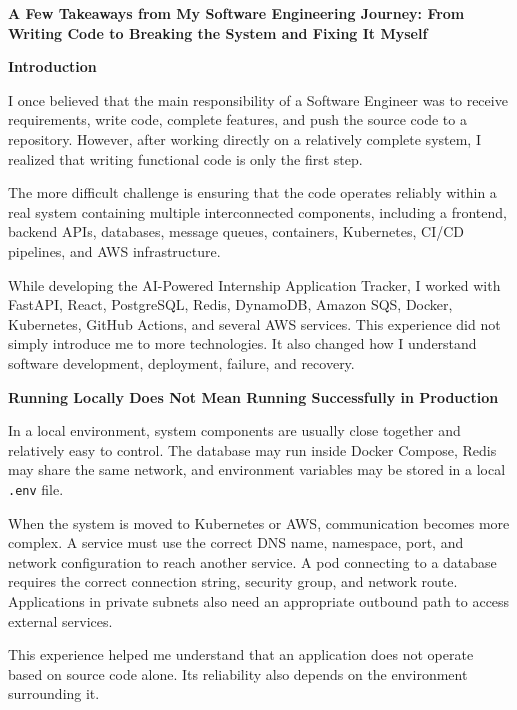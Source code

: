 \vspace{0.5em}\noindent\textbf{A Few Takeaways from My Software Engineering Journey: From
Writing Code to Breaking the System and Fixing It
Myself}\par

\vspace{0.5em}\noindent\textbf{Introduction}\par

I once believed that the main responsibility of a Software Engineer was
to receive requirements, write code, complete features, and push the
source code to a repository. However, after working directly on a
relatively complete system, I realized that writing functional code is
only the first step.

The more difficult challenge is ensuring that the code operates reliably
within a real system containing multiple interconnected components,
including a frontend, backend APIs, databases, message queues,
containers, Kubernetes, CI/CD pipelines, and AWS infrastructure.

While developing the AI-Powered Internship Application Tracker, I worked
with FastAPI, React, PostgreSQL, Redis, DynamoDB, Amazon SQS, Docker,
Kubernetes, GitHub Actions, and several AWS services. This experience
did not simply introduce me to more technologies. It also changed how I
understand software development, deployment, failure, and recovery.

\vspace{0.5em}\noindent\textbf{Running Locally Does Not Mean Running Successfully in
Production}\par

In a local environment, system components are usually close together and
relatively easy to control. The database may run inside Docker Compose,
Redis may share the same network, and environment variables may be
stored in a local \texttt{.\allowbreak{}env} file.

When the system is moved to Kubernetes or AWS, communication becomes
more complex. A service must use the correct DNS name, namespace, port,
and network configuration to reach another service. A pod connecting to
a database requires the correct connection string, security group, and
network route. Applications in private subnets also need an appropriate
outbound path to access external services.

This experience helped me understand that an application does not
operate based on source code alone. Its reliability also depends on the
environment surrounding it.


